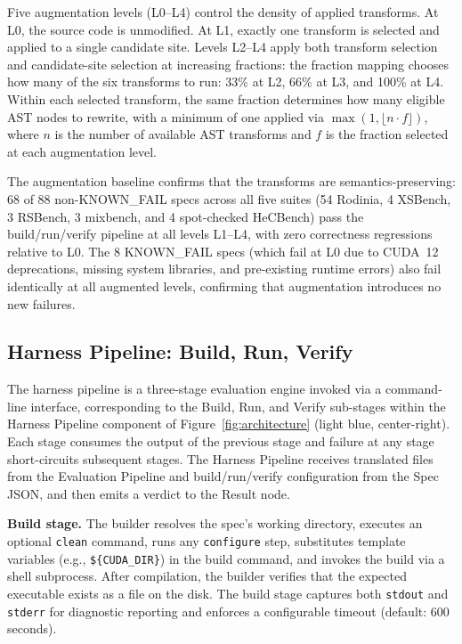 \documentclass{article}
\begin{document}

Five augmentation levels (L0--L4) control the density of applied transforms. At L0, the source code is unmodified. At L1, exactly one transform is selected and applied to a single candidate site. Levels L2--L4 apply both transform selection and candidate-site selection at increasing fractions: the fraction mapping chooses how many of the six transforms to run: 33\% at L2, 66\% at L3, and 100\% at L4. Within each selected transform, the same fraction determines how many eligible AST nodes to rewrite, with a minimum of one applied via $\max(1, \lfloor n \cdot f \rfloor)$, where $n$ is the number of available AST transforms and $f$ is the fraction selected at each augmentation level.

The augmentation baseline confirms that the transforms are semantics-preserving: 68 of 88 non-KNOWN\_FAIL specs across all five suites (54 Rodinia, 4 XSBench, 3 RSBench, 3 mixbench, and 4 spot-checked HeCBench) pass the build/run/verify pipeline at all levels L1--L4, with zero correctness regressions relative to L0. The 8 KNOWN\_FAIL specs (which fail at L0 due to CUDA~12 deprecations, missing system libraries, and pre-existing runtime errors) also fail identically at all augmented levels, confirming that augmentation introduces no new failures.

\subsection{Harness Pipeline: Build, Run, Verify}
\label{sec:harness}

The harness pipeline is a three-stage evaluation engine invoked via a command-line interface, corresponding to the Build, Run, and Verify sub-stages within the Harness Pipeline component of Figure~\ref{fig:architecture} (light blue, center-right). Each stage consumes the output of the previous stage and failure at any stage short-circuits subsequent stages. The Harness Pipeline receives translated files from the Evaluation Pipeline and build/run/verify configuration from the Spec JSON, and then emits a verdict to the Result node.

\textbf{Build stage.} The builder resolves the spec's working directory, executes an optional \texttt{clean} command, runs any \texttt{configure} step, substitutes template variables (e.g., \texttt{\$\{CUDA\_DIR\}}) in the build command, and invokes the build via a shell subprocess. After compilation, the builder verifies that the expected executable exists as a file on the disk. The build stage captures both \texttt{stdout} and \texttt{stderr} for diagnostic reporting and enforces a configurable timeout (default: 600 seconds).
\end{document}
